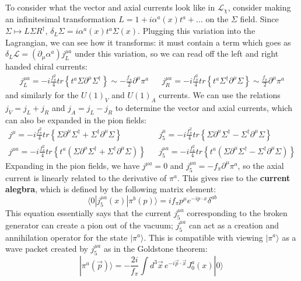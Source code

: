 \documentclass[11pt, oneside]{article}   	%
\theoremstyle{definition}
\numberwithin{equation}{subsection}		%
\begin{document}
To consider what the vector and axial currents look like in $\mathcal L_\chi$, consider making an infinitesimal transformation $L = 1 + 
i\alpha^a(x) t^a + ...$ on the $\Sigma$ field. Since $\Sigma\mapsto L\Sigma R^\dagger$, $\delta_L\Sigma = i\alpha^a(x) t^a \Sigma(x)$. 
Plugging this variation into the Lagrangian, we can see how it transforms: it must contain a term which goes as $\delta_L\mathcal L = 
(\partial_\mu\alpha^a) j_{L}^{\mu a}$ under this variation, so we can read off the left and right handed chiral currents:
\begin{align}
	j_L^{\mu a} = -i\frac{f_\pi^2}{4} tr\left\{t^a \Sigma\partial^\mu\Sigma^\dagger\right\}\sim -\frac{f_\pi}{2}\partial^\mu\pi^a && j_R^{\mu a} = -i\frac{f_\pi^2}{4} tr\left\{t^a \Sigma^\dagger \partial^\mu\Sigma\right\}\sim \frac{f_\pi}{2}\partial^\mu\pi^a
\end{align}
and similarly for the $U(1)_V$ and $U(1)_A$ currents. We can use the relations $j_V = j_L + j_R$ and $j_A = j_L - j_R$ to determine the 
vector and axial currents, which can also be expanded in the pion fields:
\begin{align}
 	j^\mu = -i\frac{f_\pi^2}{4}tr\left\{\Sigma\partial^\mu\Sigma^\dagger + \Sigma^\dagger\partial^\mu\Sigma\right\} && j_5^\mu = - 
	i\frac{f_\pi^2}{4}tr\left\{\Sigma\partial^\mu\Sigma^\dagger - \Sigma^\dagger\partial^\mu\Sigma\right\} \nonumber \\
	j^{\mu a} = -i\frac{f_\pi^2}{4}tr\left\{t^a \left(\Sigma\partial^\mu\Sigma^\dagger + \Sigma^\dagger\partial^\mu\Sigma\right)\right\}
	&& j_5^{\mu a} = -i\frac{f_\pi^2}{4}tr\left\{ t^a\left(\Sigma\partial^\mu\Sigma^\dagger - \Sigma^\dagger\partial^\mu\Sigma\right)\right\} 
\end{align}
Expanding in the pion fields, we have $j^{\mu a} = 0$ and $j_5^{\mu a} = -f_\pi\partial^\mu\pi^a$, so the axial current is linearly related 
to the derivative of $\pi^a$. This gives rise to the \textbf{current alegbra}, which is defined by the following matrix element:
\begin{equation}
	\langle 0 | j_5^{\mu a}(x) | \pi^b(p)\rangle = if_\pi p^\mu e^{-ip\cdot x}\delta^{ab}
\end{equation}
This equation essentially says that the current $j_5^{\mu a}$ corresponding to the broken generator can create a pion out of the vacuum; $j_5^{\mu a}$ can act as a 
creation and annihilation operator for the state $|\pi^a\rangle$. This is compatible with viewing $|\pi^a\rangle$ as a wave packet created by $j_5^{\mu a}$ as in the 
Goldstone theorem:
\begin{equation}
	|\pi^a(\vec p)\rangle = -\frac{2i}{f_\pi}\int d^3\vec x \, e^{-i\vec p\cdot \vec x} J_0^a(x) |0\rangle~
	\label{eq:current_algebra}
\end{equation}
\end{document}
